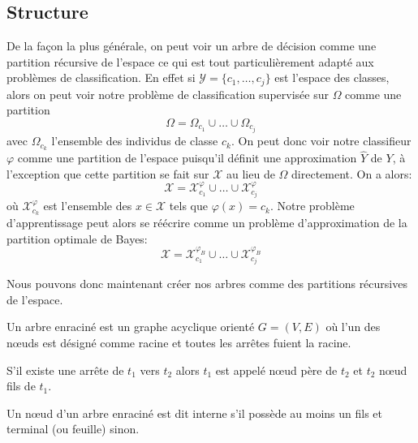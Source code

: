 \subsection{Structure}

De la façon la plus générale, on peut voir un arbre de décision comme une partition récursive de l'espace ce qui est tout particulièrement adapté aux problèmes de classification. En effet si $\mathcal{Y} = \{c_1, \dotsc, c_j \}$\label{ntn:c_k} est l'espace des classes, alors on peut voir notre problème de classification supervisée sur $\Omega$ comme une partition 
\begin{equation*}
    \Omega = \Omega_{c_1} \cup \dotsc \cup \Omega_{c_j}    
\end{equation*}
avec $\Omega_{c_k}$ l'ensemble des individus de classe $c_k$. On peut donc voir notre classifieur $\varphi$ comme une partition de l'espace puisqu'il définit une approximation $\hat{Y}$ de $Y$, à l'exception que cette partition se fait sur $\mathcal{X}$ au lieu de $\Omega$ directement. On a alors:
\begin{equation*}
    \mathcal{X} = \mathcal{X}^{\varphi}_{c_1} \cup \dotsc \cup \mathcal{X}^{\varphi}_{c_j}
\end{equation*}
où $\mathcal{X}^{\varphi}_{c_k}$ est l'ensemble des $x \in \mathcal{X}$ tels que $\varphi (x) = c_k$. Notre problème d'apprentissage peut alors se réécrire comme un problème d'approximation de la partition optimale de Bayes:
\begin{equation*}
    \mathcal{X} = \mathcal{X}^{\varphi_B}_{c_1} \cup \dotsc \cup \mathcal{X}^{\varphi_B}_{c_j}
\end{equation*}

Nous pouvons donc maintenant créer nos arbres comme des partitions récursives de l'espace.

\begin{definition}
    Un arbre enraciné est un graphe acyclique orienté $G=(V,E)$ où l'un des nœuds est désigné comme racine et toutes les arrêtes fuient la racine.
\end{definition}

\begin{definition}[Nœuds]
    S’il existe une arrête de $t_1$ vers $t_2$ alors $t_1$ est appelé nœud père de $t_2$ et $t_2$ nœud fils de $t_1$. 
\end{definition}

\begin{definition}
    Un nœud d'un arbre enraciné est dit interne s’il possède au moins un fils et terminal (ou feuille) sinon.
\end{definition}


